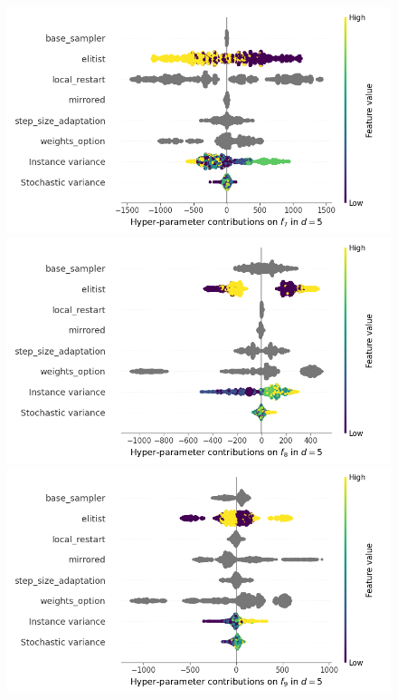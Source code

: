 \begin{figure}[t]
	\includegraphics[height=0.15\textheight,trim=60mm 0mm 30mm 0mm,clip]{images/img_summary_f7_d5.png}
	\includegraphics[height=0.15\textheight,trim=60mm 0mm 0mm 0mm,clip]{images/img_summary_f8_d5.png}
	\includegraphics[height=0.15\textheight,trim=0mm 0mm 30mm 0mm,clip]{images/img_summary_f9_d5.png}

\end{figure}
